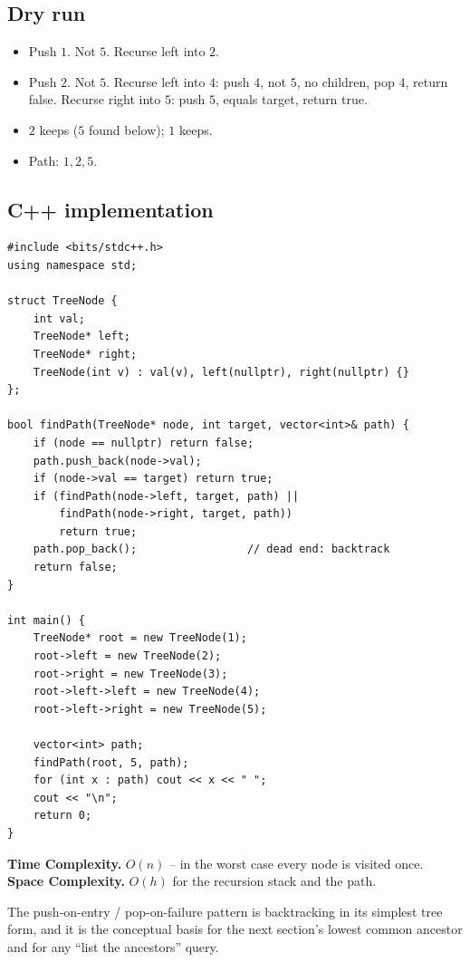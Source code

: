 \subsection*{Dry run}


\begin{itemize}
  \item Push $1$. Not $5$. Recurse left into $2$.
  \item Push $2$. Not $5$. Recurse left into $4$: push $4$, not $5$, no
        children, pop $4$, return false. Recurse right into $5$: push
        $5$, equals target, return true.
  \item $2$ keeps ($5$ found below); $1$ keeps.
  \item Path: $1,2,5$.
\end{itemize}

\subsection*{C++ implementation}

\begin{lstlisting}
#include <bits/stdc++.h>
using namespace std;

struct TreeNode {
    int val;
    TreeNode* left;
    TreeNode* right;
    TreeNode(int v) : val(v), left(nullptr), right(nullptr) {}
};

bool findPath(TreeNode* node, int target, vector<int>& path) {
    if (node == nullptr) return false;
    path.push_back(node->val);
    if (node->val == target) return true;
    if (findPath(node->left, target, path) ||
        findPath(node->right, target, path))
        return true;
    path.pop_back();                 // dead end: backtrack
    return false;
}

int main() {
    TreeNode* root = new TreeNode(1);
    root->left = new TreeNode(2);
    root->right = new TreeNode(3);
    root->left->left = new TreeNode(4);
    root->left->right = new TreeNode(5);

    vector<int> path;
    findPath(root, 5, path);
    for (int x : path) cout << x << " ";
    cout << "\n";
    return 0;
}
\end{lstlisting}

\begin{complexitybox}
\textbf{Time Complexity.} $O(n)$ -- in the worst case every node is
visited once. \textbf{Space Complexity.} $O(h)$ for the recursion stack
and the path.
\end{complexitybox}

\begin{takeawaybox}
The push-on-entry / pop-on-failure pattern is backtracking in its simplest
tree form, and it is the conceptual basis for the next section's lowest
common ancestor and for any ``list the ancestors'' query.
\end{takeawaybox}
